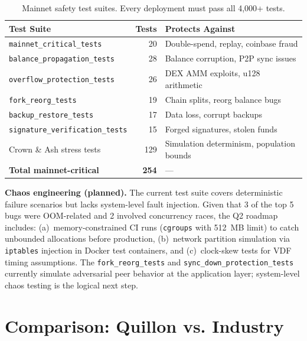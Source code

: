 \documentclass[11pt,a4paper]{article}
\begin{document}
\vspace{0.3cm}

\begin{table}[H]
\centering
\small
\begin{tabular}{l r l}
\toprule
\textbf{Test Suite} & \textbf{Tests} & \textbf{Protects Against} \\
\midrule
\texttt{mainnet\_critical\_tests} & 20 & Double-spend, replay, coinbase fraud \\
\texttt{balance\_propagation\_tests} & 28 & Balance corruption, P2P sync issues \\
\texttt{overflow\_protection\_tests} & 26 & DEX AMM exploits, u128 arithmetic \\
\texttt{fork\_reorg\_tests} & 19 & Chain splits, reorg balance bugs \\
\texttt{backup\_restore\_tests} & 17 & Data loss, corrupt backups \\
\texttt{signature\_verification\_tests} & 15 & Forged signatures, stolen funds \\
Crown \& Ash stress tests & 129 & Simulation determinism, population bounds \\
\midrule
\textbf{Total mainnet-critical} & \textbf{254} & --- \\
\bottomrule
\end{tabular}
\caption{Mainnet safety test suites. Every deployment must pass all 4,000+ tests.}
\end{table}

\noindent\textbf{Chaos engineering (planned).} The current test suite covers deterministic failure scenarios but lacks system-level fault injection. Given that 3 of the top 5 bugs were OOM-related and 2 involved concurrency races, the Q2 roadmap includes: (a)~memory-constrained CI runs (\texttt{cgroups} with 512~MB limit) to catch unbounded allocations before production, (b)~network partition simulation via \texttt{iptables} injection in Docker test containers, and (c)~clock-skew tests for VDF timing assumptions. The \texttt{fork\_reorg\_tests} and \texttt{sync\_down\_protection\_tests} currently simulate adversarial peer behavior at the application layer; system-level chaos testing is the logical next step.

\section{Comparison: Quillon vs. Industry}
\end{document}
